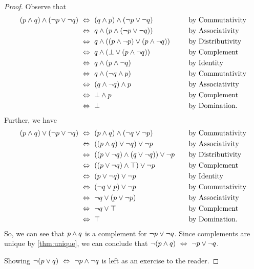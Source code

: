 \begin{proof}
    Observe that
    \begin{alignat*}{2}
        (p \wedge q) \wedge (\neg p \vee \neg q) &~\Leftrightarrow~ (q \wedge p) \wedge (\neg p \vee \neg q)~~~~~~~~~~~~&&\text{by Commutativity}\\
                                                &~\Leftrightarrow~ q \wedge (p \wedge (\neg p \vee \neg q)) &&\text{by Associativity}\\
                                                &~\Leftrightarrow~ q \wedge ((p \wedge \neg p) \vee (p \wedge \neg q)) &&\text{by Distributivity}\\
                                                &~\Leftrightarrow~ q \wedge (\bot \vee (p \wedge \neg q)) &&\text{by Complement}\\
                                                &~\Leftrightarrow~ q \wedge (p \wedge \neg q) &&\text{by Identity}\\
                                                &~\Leftrightarrow~ q \wedge (\neg q \wedge p) &&\text{by Commutativity}\\
                                                &~\Leftrightarrow~ (q \wedge \neg q) \wedge p &&\text{by Associativity}\\
                                                &~\Leftrightarrow~ \bot \wedge p &&\text{by Complement}\\
                                                &~\Leftrightarrow~ \bot &&\text{by Domination}.
    \end{alignat*}
    Further, we have
    \begin{alignat*}{2}
        (p \wedge q) \vee (\neg p \vee \neg q) &~\Leftrightarrow~ (p \wedge q) \wedge (\neg q \vee \neg p)~~~~~~~~~~~~&&\text{by Commutativity}\\
                                                &~\Leftrightarrow~ ((p \wedge q) \vee \neg q) \vee \neg p &&\text{by Associativity}\\
                                                &~\Leftrightarrow~ ((p \vee \neg q) \wedge (q \vee \neg q)) \vee \neg p &&\text{by Distributivity}\\
                                                &~\Leftrightarrow~ ((p \vee \neg q) \wedge \top) \vee \neg p &&\text{by Complement}\\
                                                &~\Leftrightarrow~ (p \vee \neg q) \vee \neg p &&\text{by Identity}\\
                                                &~\Leftrightarrow~ (\neg q \vee p) \vee \neg p &&\text{by Commutativity}\\
                                                &~\Leftrightarrow~ \neg q \vee (p \vee \neg p) &&\text{by Associativity}\\
                                                &~\Leftrightarrow~ \neg q \vee \top &&\text{by Complement}\\
                                                &~\Leftrightarrow~ \top &&\text{by Domination}.
    \end{alignat*}
    So, we can see that $p \wedge q$ is a complement for $\neg p \vee \neg q$.
    Since complements are unique by \autoref{thm:unique},
    we can conclude that $\neg (p \wedge q) ~\Leftrightarrow~ \neg p \vee \neg q$.

    Showing $\neg (p \vee q) ~\Leftrightarrow~ \neg p \wedge \neg q$ is left as an exercise to the reader.
\end{proof}


